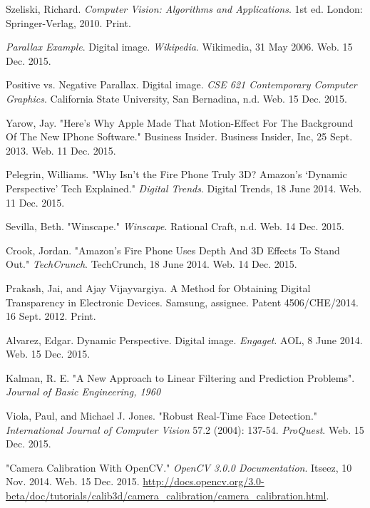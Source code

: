 \documentclass[12pt,twocolumn,letterpaper]{article}
\begin{document}
{\small{
\begin{thebibliography}{15}

Szeliski, Richard. \textit{Computer Vision: Algorithms and Applications}. 1st ed. London: Springer-Verlag, 2010. Print.

\textit{Parallax Example}. Digital image. \textit{Wikipedia}. Wikimedia, 31 May 2006. Web. 15 Dec. 2015.

Positive vs. Negative Parallax. Digital image. \textit{CSE 621 Contemporary Computer Graphics}. California State University, San Bernadina, n.d. Web. 15 Dec. 2015.

Yarow, Jay. "Here's Why Apple Made That Motion-Effect For The Background Of The New IPhone Software." Business Insider. Business Insider, Inc, 25 Sept. 2013. Web. 11 Dec. 2015.

Pelegrin, Williams. "Why Isn’t the Fire Phone Truly 3D? Amazon’s ‘Dynamic Perspective’ Tech Explained." \textit{Digital Trends}. Digital Trends, 18 June 2014. Web. 11 Dec. 2015.

Sevilla, Beth. "Winscape." \textit{Winscape}. Rational Craft, n.d. Web. 14 Dec. 2015.

Crook, Jordan. "Amazon’s Fire Phone Uses Depth And 3D Effects To Stand Out." \textit{TechCrunch}. TechCrunch, 18 June 2014. Web. 14 Dec. 2015.

Prakash, Jai, and Ajay Vijayvargiya. A Method for Obtaining Digital Transparency in Electronic Devices. Samsung, assignee. Patent 4506/CHE/2014. 16 Sept. 2012. Print.

Alvarez, Edgar. Dynamic Perspective. Digital image. \textit{Engaget}. AOL, 8 June 2014. Web. 15 Dec. 2015.

 Kalman, R. E. "A New Approach to Linear Filtering and Prediction Problems". \textit{Journal of Basic Engineering, 1960}

Viola, Paul, and Michael J. Jones. "Robust Real-Time Face Detection." \textit{International Journal of Computer Vision} 57.2 (2004): 137-54. \textit{ProQuest}. Web. 15 Dec. 2015.

"Camera Calibration With OpenCV." \textit{OpenCV 3.0.0 Documentation}. Itseez, 10 Nov. 2014. Web. 15 Dec. 2015.  \url{http://docs.opencv.org/3.0-beta/doc/tutorials/calib3d/camera_calibration/camera_calibration.html}.


\end{thebibliography}}}
\end{document}
